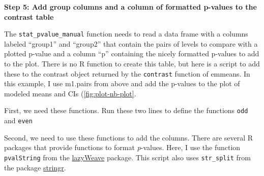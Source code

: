 \documentclass[]{book}
\newenvironment{Shaded}{\begin{snugshade}}{\end{snugshade}}
\newcommand{\CommentTok}[1]{\textcolor[rgb]{0.56,0.35,0.01}{\textit{#1}}}
\newcommand{\ControlFlowTok}[1]{\textcolor[rgb]{0.13,0.29,0.53}{\textbf{#1}}}
\newcommand{\DecValTok}[1]{\textcolor[rgb]{0.00,0.00,0.81}{#1}}
\newcommand{\ErrorTok}[1]{\textcolor[rgb]{0.64,0.00,0.00}{\textbf{#1}}}
\newcommand{\KeywordTok}[1]{\textcolor[rgb]{0.13,0.29,0.53}{\textbf{#1}}}
\newcommand{\NormalTok}[1]{#1}
\newcommand{\OperatorTok}[1]{\textcolor[rgb]{0.81,0.36,0.00}{\textbf{#1}}}
\newcommand{\StringTok}[1]{\textcolor[rgb]{0.31,0.60,0.02}{#1}}
\begin{document}
\textbf{Step 5: Add group columns and a column of formatted p-values to the contrast table}

The \texttt{stat\_pvalue\_manual} function needs to read a data frame with a columns labeled ``group1'' and ``group2'' that contain the pairs of levels to compare with a plotted p-value and a column ``p'' containing the nicely formatted p-values to add to the plot. There is no R function to create this table, but here is a script to add these to the contrast object returned by the \texttt{contrast} function of emmeans. In this example, I use m1.pairs from above and add the p-values to the plot of modeled means and CIs (\ref{fig:plot-nb-plot}.

First, we need these functions. Run these two lines to define the functions \texttt{odd} and \texttt{even}

\begin{Shaded}
\end{Shaded}

Second, we need to use these functions to add the columns. There are several R packages that provide functions to format \emph{p}-values. Here, I use the function \texttt{pvalString} from the \href{https://www.rdocumentation.org/packages/lazyWeave/versions/3.0.2/topics/pvalString}{lazyWeave} package. This script also uses \texttt{str\_split} from the package \href{https://cran.r-project.org/web/packages/stringr/index.html}{stringr}.

\begin{Shaded}
\end{Shaded}
\end{document}

